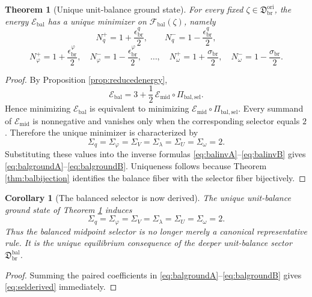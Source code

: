 \documentclass[11pt]{article}
\newcommand{\OriginSector}{\mathfrak D_{\mathrm{br}}^{\mathrm{ori}}}
\newcommand{\PolRead}{\epsilon_{\mathrm{br}}^{q}}
\newcommand{\PolCov}{\epsilon_{\mathrm{br}}^{\varphi}}
\newcommand{\PolScale}{\sigma_{\mathrm{br}}}
\newcommand{\SelRead}{\Sigma_{q}}
\newcommand{\SelCov}{\Sigma_{\varphi}}
\newcommand{\SelRelax}{\Sigma_{V}}
\newcommand{\SelWell}{\Sigma_{\lambda}}
\newcommand{\SelEq}{\Sigma_{U}}
\newcommand{\SelScale}{\Sigma_{\omega}}
\newcommand{\SelEnergy}{\mathscr E_{\mathrm{mid}}}
\newcommand{\MidBalanceSector}{\mathfrak D_{\mathrm{br}}^{\mathrm{bal}}}
\newcommand{\BalSelMap}{\Pi_{\mathrm{bal,sel}}}
\newcommand{\BalFiberClass}{\mathscr F_{\mathrm{bal}}}
\newcommand{\BalEnergy}{\mathscr E_{\mathrm{bal}}}
\newcommand{\BalReadPlus}{N_{q}^{+}}
\newcommand{\BalReadMinus}{N_{q}^{-}}
\newcommand{\BalCovPlus}{N_{\varphi}^{+}}
\newcommand{\BalCovMinus}{N_{\varphi}^{-}}
\newcommand{\BalScalePlus}{N_{\omega}^{+}}
\newcommand{\BalScaleMinus}{N_{\omega}^{-}}
\newtheorem{corollary}{Corollary}
\newtheorem{theorem}{Theorem}
\begin{document}
\begin{theorem}[Unique unit-balance ground state]
\label{thm:balground}
For every fixed \(\zeta\in\OriginSector\), the energy \(\BalEnergy\) has a unique minimizer on \(\BalFiberClass(\zeta)\), namely
\begin{equation}
\BalReadPlus=1+\frac{\PolRead}{2},
\qquad
\BalReadMinus=1-\frac{\PolRead}{2},
\label{eq:balgroundA}
\end{equation}
\begin{equation}
\BalCovPlus=1+\frac{\PolCov}{2},
\quad
\BalCovMinus=1-\frac{\PolCov}{2},
\quad
\ldots,
\quad
\BalScalePlus=1+\frac{\PolScale}{2},
\quad
\BalScaleMinus=1-\frac{\PolScale}{2}.
\label{eq:balgroundB}
\end{equation}
\end{theorem}

\begin{proof}
By Proposition \ref{prop:reducedenergy},
\[
\BalEnergy
=
3+\frac12\,\SelEnergy\circ\BalSelMap.
\]
Hence minimizing \(\BalEnergy\) is equivalent to minimizing \(\SelEnergy\circ\BalSelMap\). Every summand of \(\SelEnergy\) is nonnegative and vanishes only when the corresponding selector equals \(2\). Therefore the unique minimizer is characterized by
\[
\SelRead=\SelCov=\SelRelax=\SelWell=\SelEq=\SelScale=2.
\]
Substituting these values into the inverse formulas \eqref{eq:balinvA}--\eqref{eq:balinvB} gives \eqref{eq:balgroundA}--\eqref{eq:balgroundB}. Uniqueness follows because Theorem \ref{thm:balbijection} identifies the balance fiber with the selector fiber bijectively.
\end{proof}

\begin{corollary}[The balanced selector is now derived]
\label{cor:selderived}
The unique unit-balance ground state of Theorem \ref{thm:balground} induces
\begin{equation}
\SelRead=\SelCov=\SelRelax=\SelWell=\SelEq=\SelScale=2.
\label{eq:selderived}
\end{equation}
Thus the balanced midpoint selector is no longer merely a canonical representative rule. It is the unique equilibrium consequence of the deeper unit-balance sector \(\MidBalanceSector\).
\end{corollary}

\begin{proof}
Summing the paired coefficients in \eqref{eq:balgroundA}--\eqref{eq:balgroundB} gives \eqref{eq:selderived} immediately.
\end{proof}
\end{document}
